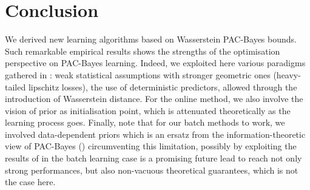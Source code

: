 \section{Conclusion}

We derived new learning algorithms based on Wasserstein PAC-Bayes bounds. Such remarkable empirical results shows the strengths of the optimisation perspective on PAC-Bayes learning. Indeed, we exploited here various paradigms gathered in : weak statistical assumptions with stronger geometric ones (heavy-tailed lipschitz losses), the use of deterministic predictors, allowed through the introduction of Wasserstein distance. For the online method, we also involve the vision of prior as initialisation point, which is attenuated theoretically as the learning process goes. Finally, note that for our batch methods to work, we involved data-dependent priors which is an ersatz from the information-theoretic view of PAC-Bayes () circumventing this limitation, possibly by exploiting the results of  in the batch learning case is a promising future lead to reach not only strong performances, but also non-vacuous theoretical guarantees, which is not the case here.  
